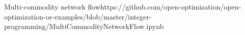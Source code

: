 {\begin{examplewithcode}{Multi-commodity network flow}{https://github.com/open-optimization/open-optimization-or-examples/blob/master/integer-programming/MultiCommodityNetworkFlow.ipynb}

\end{examplewithcode}
%
%
%
%
%
%
%
%
%
%
%
%
%
%
}
